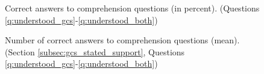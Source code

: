 \begin{figure}[h!]
    \caption[Comprehension]{Correct answers to comprehension questions (in percent). (Questions \ref{q:understood_gcs}-\ref{q:understood_both})}\label{fig:understood_each}
\end{figure}

\begin{figure}[h!]
    \caption[Comprehension score]{Number of correct answers to comprehension questions (mean). (Section \ref{subsec:gcs_stated_support}, Questions \ref{q:understood_gcs}-\ref{q:understood_both})}\label{fig:understood_score}
\end{figure}



